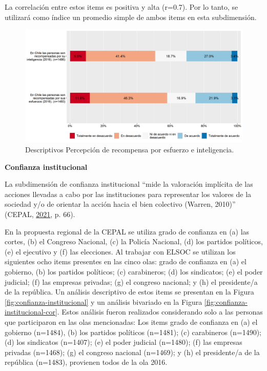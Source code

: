 \documentclass[
  12pt,
]{book}
\begin{document}
La correlación entre estos items es positiva y alta (r=0.7). Por lo tanto, se utilizará como índice un promedio simple de ambos items en esta subdimensión.

\begin{figure}[H]

{\centering \includegraphics[width=1\linewidth,height=1\textheight]{output/graphs/justicia} 

}

\caption{Descriptivos Percepción de recompensa por esfuerzo e inteligencia.}\label{fig:justicia}
\end{figure}

\textbf{Confianza institucional}

La subdimensión de confianza institucional ``mide la valoración implícita de las acciones llevadas a cabo por las instituciones para representar los valores de la sociedad y/o de orientar la acción hacia el bien colectivo (Warren, 2010)'' (CEPAL, \protect\hyperlink{ref-cepal_cohesion_2021}{2021}, p. 66).

En la propuesta regional de la CEPAL se utiliza grado de confianza en (a) las cortes, (b) el Congreso Nacional, (c) la Policía Nacional, (d) los partidos políticos, (e) el ejecutivo y (f) las elecciones. Al trabajar con ELSOC se utilizan los siguientes ocho items presentes en las cinco olas: grado de confianza en (a) el gobierno, (b) los partidos políticos; (c) carabineros; (d) los sindicatos; (e) el poder judicial; (f) las empresas privadas; (g) el congreso nacional; y (h) el presidente/a de la república. Un análisis descriptivo de estos items se presentan en la Figura \ref{fig:confianza-institucional} y un análisis bivariado en la Figura \ref{fig:confianza-institucional-cor}. Estos análisis fueron realizados considerando solo a las personas que participaron en las olas mencionadas: Los items grado de confianza en (a) el gobierno (n=1484), (b) los partidos políticos (n=1481); (c) carabineros (n=1490); (d) los sindicatos (n=1407); (e) el poder judicial (n=1480); (f) las empresas privadas (n=1468); (g) el congreso nacional (n=1469); y (h) el presidente/a de la república (n=1483), provienen todos de la ola 2016.
\end{document}
